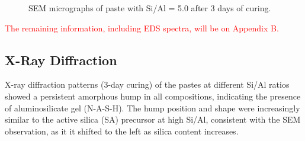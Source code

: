 \begin{figure}[H]
  \centering
  \caption{SEM micrographs of paste with Si/Al = 5.0 after 3 days of curing.}
  \label{fig:si_al_5-0_spot1_sem}
\end{figure}

\textcolor{red}{The remaining information, including EDS spectra, will be on Appendix B.}




\subsection{X-Ray Diffraction}

X-ray diffraction patterns (3-day curing) of the pastes at different Si/Al ratios showed a persistent amorphous hump in all compositions, indicating the presence of aluminosilicate gel (N-A-S-H).
The hump position and shape were increasingly similar to the active silica (SA) precursor at high Si/Al, consistent with the SEM observation, as it it shifted to the left as silica content increases. 


